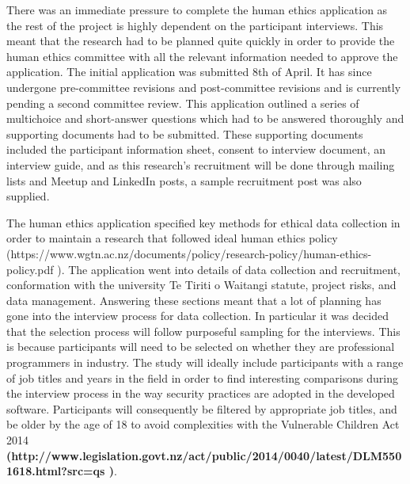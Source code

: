 \par There was an immediate pressure to complete the human ethics application as the rest of the project is highly dependent on the participant interviews. This meant that the research had to be planned quite quickly in order to provide the human ethics committee with all the relevant information needed to approve the application. The initial application was submitted 8th of April. It has since undergone pre-committee revisions and post-committee revisions and is currently pending a second committee review. This application outlined a series of multichoice and short-answer questions which had to be answered thoroughly and supporting documents had to be submitted. These supporting documents included the participant information sheet, consent to interview document, an interview guide, and as this research’s recruitment will be done through mailing lists and Meetup and LinkedIn posts, a sample recruitment post was also supplied. 
\newline
\par The human ethics application specified key methods for ethical data collection in order to maintain a research that followed ideal  human ethics policy
(https://www.wgtn.ac.nz/documents/policy/research-policy/human-ethics-policy.pdf
). The application went into details of data collection and recruitment, conformation with the university Te Tiriti o Waitangi statute, project risks, and data management. Answering these sections meant that a lot of planning has gone into the interview process for data collection. In particular it was decided that the selection process will follow purposeful sampling for the interviews. This is because participants will need to be selected on whether they are professional programmers in industry. The study will ideally include participants with a range of job titles and years in the field in order to find interesting comparisons during the interview process in the way security practices are adopted in the developed software. Participants will consequently be filtered by appropriate job titles, and be older by the age of 18 to avoid complexities with the Vulnerable Children Act 2014
\textbf{(http://www.legislation.govt.nz/act/public/2014/0040/latest/DLM5501618.html?src=qs
)}. 
\newline
